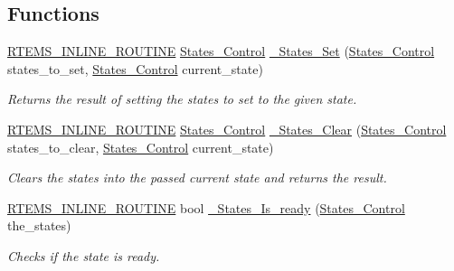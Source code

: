 \subsection*{Functions}
\begin{DoxyCompactItemize}
\item 
\mbox{\hyperlink{group__RTEMSScoreBaseDefs_gac216239df231d5dbd15e3520b0b9313f}{R\+T\+E\+M\+S\+\_\+\+I\+N\+L\+I\+N\+E\+\_\+\+R\+O\+U\+T\+I\+NE}} \mbox{\hyperlink{group__RTEMSScoreStates_gaeebbea0bfca162709b124fd519cf99d3}{States\+\_\+\+Control}} \mbox{\hyperlink{group__RTEMSScoreStates_gab97b4638c5f5c839306d73f9073af7e8}{\+\_\+\+States\+\_\+\+Set}} (\mbox{\hyperlink{group__RTEMSScoreStates_gaeebbea0bfca162709b124fd519cf99d3}{States\+\_\+\+Control}} states\+\_\+to\+\_\+set, \mbox{\hyperlink{group__RTEMSScoreStates_gaeebbea0bfca162709b124fd519cf99d3}{States\+\_\+\+Control}} current\+\_\+state)
\begin{DoxyCompactList}\small\item\em Returns the result of setting the states to set to the given state. \end{DoxyCompactList}\item 
\mbox{\hyperlink{group__RTEMSScoreBaseDefs_gac216239df231d5dbd15e3520b0b9313f}{R\+T\+E\+M\+S\+\_\+\+I\+N\+L\+I\+N\+E\+\_\+\+R\+O\+U\+T\+I\+NE}} \mbox{\hyperlink{group__RTEMSScoreStates_gaeebbea0bfca162709b124fd519cf99d3}{States\+\_\+\+Control}} \mbox{\hyperlink{group__RTEMSScoreStates_gabe395b719ed97f651f8df63a1cc20149}{\+\_\+\+States\+\_\+\+Clear}} (\mbox{\hyperlink{group__RTEMSScoreStates_gaeebbea0bfca162709b124fd519cf99d3}{States\+\_\+\+Control}} states\+\_\+to\+\_\+clear, \mbox{\hyperlink{group__RTEMSScoreStates_gaeebbea0bfca162709b124fd519cf99d3}{States\+\_\+\+Control}} current\+\_\+state)
\begin{DoxyCompactList}\small\item\em Clears the states into the passed current state and returns the result. \end{DoxyCompactList}\item 
\mbox{\hyperlink{group__RTEMSScoreBaseDefs_gac216239df231d5dbd15e3520b0b9313f}{R\+T\+E\+M\+S\+\_\+\+I\+N\+L\+I\+N\+E\+\_\+\+R\+O\+U\+T\+I\+NE}} bool \mbox{\hyperlink{group__RTEMSScoreStates_ga15946028917e3bbb7ecce815aedf5d82}{\+\_\+\+States\+\_\+\+Is\+\_\+ready}} (\mbox{\hyperlink{group__RTEMSScoreStates_gaeebbea0bfca162709b124fd519cf99d3}{States\+\_\+\+Control}} the\+\_\+states)
\begin{DoxyCompactList}\small\item\em Checks if the state is ready. \end{DoxyCompactList}\item 

\end{DoxyCompactItemize}
